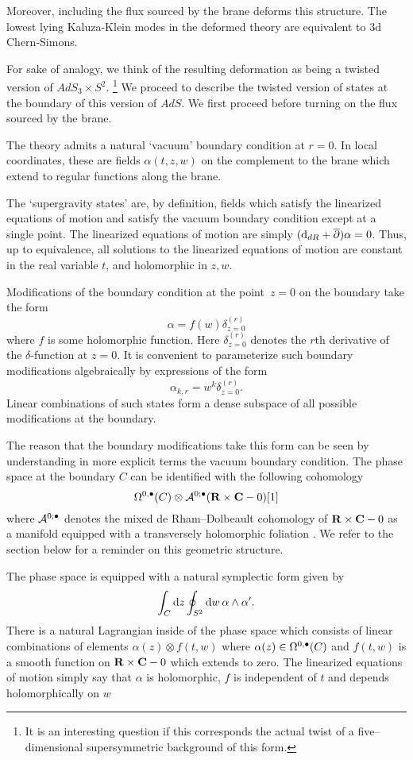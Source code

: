 Moreover, including the flux sourced by the brane deforms this structure. The lowest lying Kaluza-Klein modes in the deformed theory are equivalent to 3d Chern-Simons.

For sake of analogy, we think of the resulting deformation as being a twisted version of $AdS_3 \times S^2$. \footnote{It is an interesting question if this corresponds the actual twist of a five--dimensional supersymmetric background of this form.}
We proceed to describe the twisted version of states at the boundary of this version of $AdS$.
We first proceed before turning on the flux sourced by the brane.

The theory admits a natural `vacuum' boundary condition at $r=0$.
In local coordinates, these are fields $\alpha(t,z,w)$ on the complement to the brane which extend to regular functions along the brane.

The `supergravity states' are, by definition, fields which satisfy the linearized equations of motion and satisfy the vacuum boundary condition except at a single point.
The linearized equations of motion are simply $({\rm d}_{dR} + \overline{\partial}) \alpha = 0$.
Thus, up to equivalence, all solutions to the linearized equations of motion are constant in the real variable $t$, and holomorphic in $z,w$.

Modifications of the boundary condition at the point~$z = 0$ on the boundary take the form
\[
\alpha = f(w) \delta^{(r)}_{z=0}
\]
where $f$ is some holomorphic function.
Here $\delta^{(r)}_{z=0}$ denotes the $r$th derivative of the $\delta$-function at $z=0$.
It is convenient to parameterize such boundary modifications algebraically by expressions of the form
\[
\alpha_{k,r} = w^k \delta^{(r)}_{z=0} .
\]
Linear combinations of such states form a dense subspace of all possible modifications at the boundary.

The reason that the boundary modifications take this form can be seen by understanding in more explicit terms the vacuum boundary condition.
The phase space at the boundary $C$ can be identified with the following cohomology
\[
\Omega^{0,\bullet}(C) \otimes \mathcal A^{0;\bullet}(\mathbf{R} \times \mathbf{C} - 0) [1]
\]
where $\mathcal A^{0;\bullet}$ denotes the mixed de Rham--Dolbeault cohomology of $\mathbf{R} \times \mathbf{C} - 0$ as a manifold equipped with a transversely holomorphic foliation \cite{DuchampKalka}.
We refer to the section below for a reminder on this geometric structure.

The phase space is equipped with a natural symplectic form given by
\[
\int_C {\rm d} z \oint_{S^2} {\rm d} w \, \alpha \wedge \alpha' .
\]
There is a natural Lagrangian inside of the phase space which consists of linear combinations of elements $\alpha(z) \otimes f(t,w)$ where $\alpha(z) \in \Omega^{0,\bullet}(C)$ and $f(t,w)$ is a smooth function on $\mathbf{R} \times \mathbf{C} - 0$ which extends to zero.
The linearized equations of motion simply say that $\alpha$ is holomorphic, $f$ is independent of $t$ and depends holomorphically on $w$


